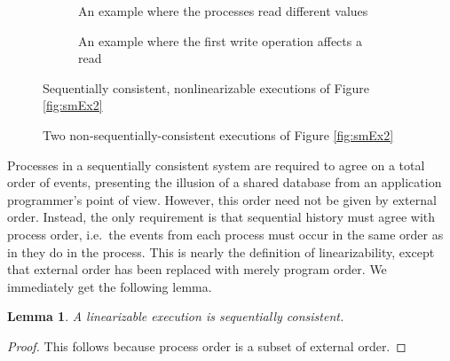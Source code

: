 \documentclass[]             %
{NASA}                       %
\newtheorem{lemma}[theorem]{Lemma}
\theoremstyle{definition}
\begin{document}
\begin{figure}[p]
  \setlength\belowcaptionskip{5ex}

  \begin{subfigure}{1\textwidth}
    \centering
    
    \caption{An example where the processes read different values}
    \label{fig:smEx1L1}
  \end{subfigure}

  \begin{subfigure}{1\textwidth}
    
    \caption{An example where the first write operation affects a read}
    \label{fig:smEx4S2}
  \end{subfigure}

  \caption{Sequentially consistent, nonlinearizable executions of Figure \ref{fig:smEx2}}
  \label{fig:smEx3}
\end{figure}

\begin{figure}[p]
  \setlength\belowcaptionskip{5ex}

  \begin{subfigure}{1\textwidth}
    \centering
    
    \caption{}
    \label{fig:smEx1L1}
  \end{subfigure}

  \begin{subfigure}{1\textwidth}
    
    \caption{}
    \label{fig:smEx4S2}
  \end{subfigure}

  \caption{Two non-sequentially-consistent executions of Figure \ref{fig:smEx2}}
  \label{fig:smEx3}
\end{figure}

\afterpage{\clearpage}

Processes in a sequentially consistent system are required to agree on
a total order of events, presenting the illusion of a shared database
from an application programmer's point of view. However, this order
need not be given by external order. Instead, the only requirement is
that sequential history must agree with process order, i.e.~the events
from each process must occur in the same order as in they do in the
process.  This is nearly the definition of linearizability, except
that external order has been replaced with merely program order. We
immediately get the following lemma.

\begin{lemma}
  \label{lem:linearsequential}
  A linearizable execution is sequentially consistent.
\end{lemma}
\begin{proof}
  This follows because process order is a subset of external order.
\end{proof}
\end{document}
